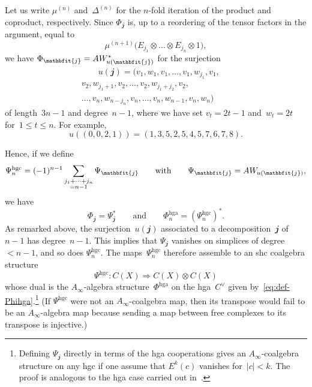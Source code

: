 \documentclass[letterpaper]{amsart}
\numberwithin{equation}{section}
\theoremstyle{plain}
\theoremstyle{definition}
\theoremstyle{remark}
\def\Ainf{A_{\infty}}
\def\deg#1{|#1|}
\def\Phihga{\Phi^{\mathrm{hga}}}
\def\Psihgc{\Psi^{\mathrm{hgc}}}
\def\jj{\mathbfit{j}}
\def\AW{AW}
\def\AWu#1{\AW_{\mkern -1mu #1}}
\begin{document}
Let us write $\mu^{(n)}$ and~$\Delta^{(n)}$ for the $n$-fold iteration of the product and coproduct, respectively.
Since $\Phi_{\jj}$ is, up to a reordering of the tensor factors in the argument, equal to
\begin{equation}
  \mu^{(n+1)}\bigl(E_{j_{1}}\otimes\dots\otimes E_{j_{n}}\otimes 1\bigr),
\end{equation}
we have $\Phi_{\jj}=\AWu{u(\jj)}^{*}$ for the surjection
\begin{multline}
  \label{eq:u-a-b}
  \qquad
  u(\jj) = (v_{1},w_{1},v_{1},\dots,v_{1},w_{j_{1}},v_{1}, \\
  v_{2},w_{j_{1}+1},v_{2},\dots,v_{2},w_{j_{1}+j_{2}},v_{2}, \\
  \dots,v_{n}, w_{n-j_{n}},v_{n},\dots,v_{n},w_{n-1},v_{n},w_{n})
  \qquad
\end{multline}
of length~$3n-1$ and degree~$n-1$,
where we have set $v_{t}=2t-1$ and~$w_{t}=2t$ for~$1\le t\le n$. For example,
\begin{equation}
  u((0,0,2,1)) = (1,3,5,2,5,4,5,7,6,7,8).
\end{equation}

Hence, if we define
\begin{equation}
  \Psihgc_{n} = (-1)^{n-1} \sum_{\substack{j_{1}+\dots+j_{n}\\=n-1}} \Psi_{\jj}
  \qquad\text{with}\qquad
  \Psi_{\jj}=\AWu{u(\jj)},
\end{equation}
we have
\begin{equation}
  \Phi_{\jj} = \Psi_{\jj}^{*}
  \qquad\text{and}\qquad
  \Phihga_{n} = (\Psihgc_{n})^{*}.
\end{equation}
As remarked above, the surjection~$u(\jj)$ associated to a decomposition~$\jj$ of~$n-1$ has degree~$n-1$.
This implies that $\Psi_{\jj}$ vanishes on simplices of degree~$<n-1$, and so does $\Psihgc_{n}$.
The maps~$\Psihgc_{n}$ therefore assemble to an shc coalgebra structure
\begin{equation}
  \Psihgc\colon C(X) \Rightarrow C(X)\otimes C(X)
\end{equation}
whose dual  is the $\Ainf$-algebra structure~$\Phihga$ on the hga~$C^{\vee}$ given by~\eqref{eq:def-Phihga}.\footnote{%
  Defining $\Psi_{\jj}$ directly in terms of the hga cooperations gives
  an $\Ainf$-coalgebra structure on any hgc if one assume that $E^{k}(c)$ vanishes for~$\deg{c}<k$.
  The proof is analogous to the hga case carried out in~\cite[Prop.~4.1]{Franz:hgashc}.}
(If $\Psihgc$ were not an $\Ainf$-coalgebra map, then its transpose would fail to be an $\Ainf$-algebra map
because sending a map between free complexes to its transpose is injective.)
\end{document}

